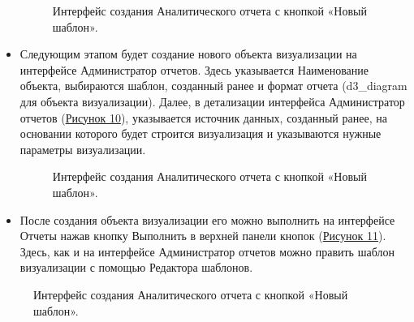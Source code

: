 \documentclass[a4paper]{extarticle}
\begin{document}
\begin{itemize}
\begin{figure}[H]
\caption{Интерфейс создания Аналитического отчета с кнопкой «Новый шаблон».}
\label{ris4_1}
\end{figure}\par
    \item Следующим этапом будет создание нового объекта визуализации на интерфейсе Администратор отчетов. Здесь указывается Наименование объекта, выбираются шаблон, созданный ранее и формат отчета (d3\_diagram для объекта визуализации). Далее, в детализации интерфейса Администратор отчетов (\hyperref[ris4_2]{Рисунок 10}), указывается источник данных, созданный ранее, на основании которого будет строится визуализация и указываются нужные параметры визуализации.
\begin{figure}[H]
\caption{Интерфейс создания Аналитического отчета с кнопкой «Новый шаблон».}
\label{ris4_2}
\end{figure}\par
    \item После создания объекта визуализации его можно выполнить на интерфейсе Отчеты нажав кнопку Выполнить в верхней панели кнопок (\hyperref[ris6]{Рисунок 11}). Здесь, как и на интерфейсе Администратор отчетов можно править шаблон визуализации с помощью Редактора шаблонов.
\end{itemize}\par
\begin{figure}[H]
\caption{Интерфейс создания Аналитического отчета с кнопкой «Новый шаблон».}
\label{ris6}
\end{figure}\par
\end{document}

